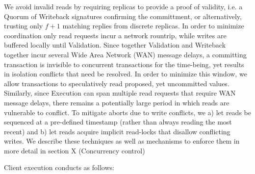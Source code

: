 We avoid invalid reads by requiring replicas to provide a proof of validity, i.e. a Quorum of Writeback signatures confirming the committment, or alternatively, trusting only $f+1$ matching replies from discrete replicas. In order to minimize coordination only read requests incur a network rountrip, while writes are buffered locally until Validation. 
Since together Validation and Writeback together incur several Wide Area Network (WAN) message delays, a committing transaction is invisible to concurrent transactions for the time-being, yet results in isolation conflicts that need be resolved. In order to minimize this window, we allow transactions to speculatively read proposed, yet uncommitted values. Similarly, since Execution can span multiple read requests that require WAN message delays, there remains a potentially large period in which reads are vulnerable to conflict. To mitigate aborts due to write conflicts, we a) let reads be sequenced at a pre-defined timestamp (rather than always reading the most recent) and b) let reads acquire implicit read-locks that disallow conflicting writes. We describe these techniques as well as mechanisms to enforce them in more detail in section X (Concurrency control) 



Client execution conducts as follows:

